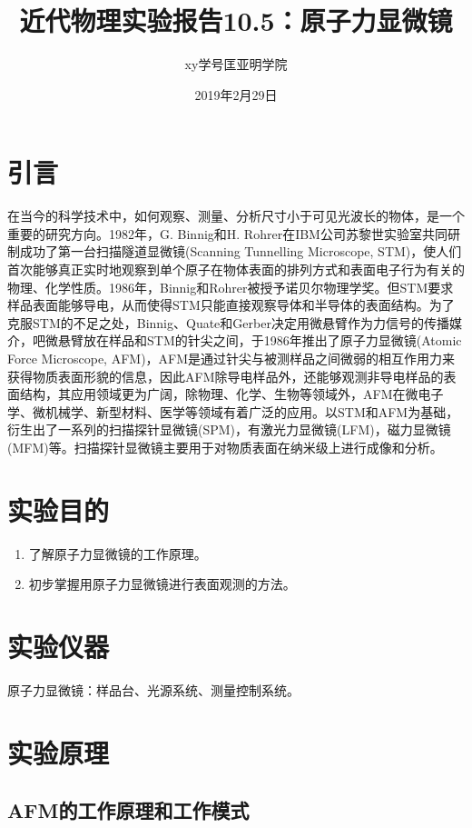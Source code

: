 \documentclass[a4paper]{article}
\title{近代物理实验报告10.5：原子力显微镜}
\author{xy\quad 学号\quad 匡亚明学院}
\date{2019年2月29日}
\begin{document}
\maketitle


\section{引言}
在当今的科学技术中，如何观察、测量、分析尺寸小于可见光波长的物体，是一个重要的研究方向。1982年，G. Binnig和H. Rohrer在IBM公司苏黎世实验室共同研制成功了第一台扫描隧道显微镜(Scanning Tunnelling Microscope, STM)，使人们首次能够真正实时地观察到单个原子在物体表面的排列方式和表面电子行为有关的物理、化学性质。1986年，Binnig和Rohrer被授予诺贝尔物理学奖。但STM要求样品表面能够导电，从而使得STM只能直接观察导体和半导体的表面结构。为了克服STM的不足之处，Binnig、Quate和Gerber决定用微悬臂作为力信号的传播媒介，吧微悬臂放在样品和STM的针尖之间，于1986年推出了原子力显微镜(Atomic Force Microscope, AFM)，AFM是通过针尖与被测样品之间微弱的相互作用力来获得物质表面形貌的信息，因此AFM除导电样品外，还能够观测非导电样品的表面结构，其应用领域更为广阔，除物理、化学、生物等领域外，AFM在微电子学、微机械学、新型材料、医学等领域有着广泛的应用。以STM和AFM为基础，衍生出了一系列的扫描探针显微镜(SPM)，有激光力显微镜(LFM)，磁力显微镜(MFM)等。扫描探针显微镜主要用于对物质表面在纳米级上进行成像和分析。

\section{实验目的}
\begin{enumerate}
\item 了解原子力显微镜的工作原理。
\item 初步掌握用原子力显微镜进行表面观测的方法。
\end{enumerate}

\section{实验仪器}
原子力显微镜：样品台、光源系统、测量控制系统。

\section{实验原理}
\subsection{AFM的工作原理和工作模式}
\end{document}
